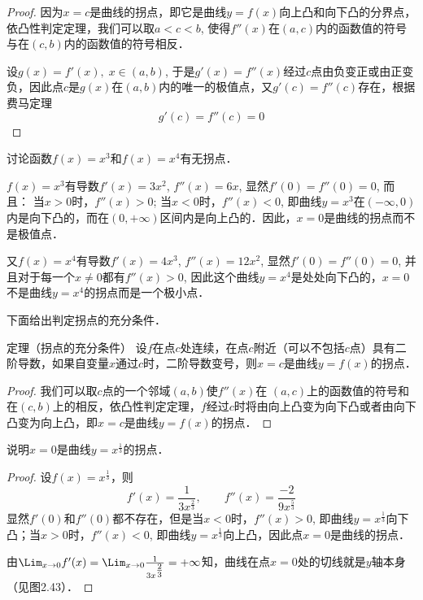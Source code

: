     \begin{proof}
        因为$x=c$是曲线的拐点，即它是曲线$y=f(x)$向上凸和向下凸的分界点，依凸性判定定理，我们可以取$a<c<b$, 使得$f''(x)$在$(a,c)$内的函数值的符号与在$(c,b)$内的函数值的符号相反．
    
    设$g(x)=f'(x),\; x\in (a,b)$, 于是$g'(x)=f''(x)$经过$c$点由负变正或由正变负，因此点$c$是$g(x)$在$(a,b)$内的唯一的极值点，又$g'(c)=f''(c)$存在，根据费马定理
    \[g' (c) =f'' (c) =0\]
    \end{proof}
    
    
    \begin{example}
        讨论函数$f(x)=x^3$和$f(x)=x^4$有无拐点．
    \end{example}
    
    
    \begin{solution}
        $f(x)=x^3$有导数$f'(x)=3x^2$, $f''(x)=6x$, 显然$f'(0)=f''(0)=0$, 而且：
    当$x>0$时，$f''(x)>0$; 当$x<0$时，$f''(x)<0$, 即曲线$y=x^3$在$(-\infty, 0)$内是向下凸的，而在$(0,+\infty)$区间内是向上凸的．因此，$x=0$是曲线的拐点而不是极值点．
    
    又$f(x)=x^4$有导数$f'(x)=4x^3$, $f''(x)=12x^2$, 显然$f'(0)=f''(0)=0$, 并且对于每一个$x\ne 0$都有$f''(x)>0$, 因此这个曲线$y=x^4$是处处向下凸的，$x=0$不是曲线$y=x^4$的拐点而是一个极小点．
    \end{solution}
    
    
    下面给出判定拐点的充分条件．
        
    \begin{blk}
       {定理（拐点的充分条件）} 设$f$在点$c$处连续，在点$c$附近（可以不包括$c$点）具有二阶导数，如果自变量$x$通过$c$时，二阶导数变号，则$x=c$是曲线$y=f(x)$的拐点．
    \end{blk}
    
    \begin{proof}
        我们可以取$c$点的一个邻域$(a,b)$使$f''(x)$在
    $(a,c)$上的函数值的符号和在$(c,b)$上的相反，依凸性判定定理，$f$经过$c$时将由向上凸变为向下凸或者由向下凸变为向上凸，即$x=c$是曲线$y=f(x)$的拐点．
    \end{proof}
    
    
    \begin{example}
    说明$x=0$是曲线$y=x^{\tfrac{1}{3}}$的拐点．
    \end{example}
    
    \begin{proof}
        设$f(x)=x^{\tfrac{1}{3}}$，则
    \[f'(x)=\frac{1}{3x^{\tfrac{2}{3}}},\qquad f''(x)=\frac{-2}{9x^{\tfrac{5}{3}}}\]
    显然$f'(0)$和$f''(0)$都不存在，但是当$x<0$时，$f''(x)>0$, 即曲线$y=x^{\tfrac{1}{3}}$向下凸；当$x>0$时，$f''(x)<0$, 即曲线$y=x^{\tfrac{1}{3}}$向上凸，因此点$x=0$是曲线的拐点．
    
    由$\Lim_{x\to 0}f'(x)=\Lim_{x\to 0}\frac{1}{3x^{\tfrac{2}{3}}}=+\infty$知，曲线在点$x=0$处的切线就是$y$轴本身（见图2.43）．
    \end{proof}
    
